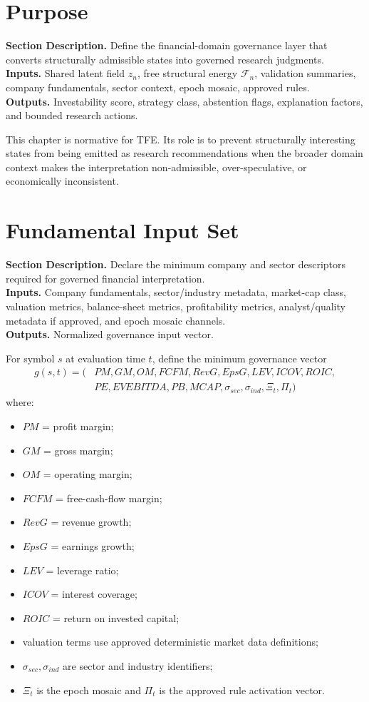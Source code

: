 \documentclass[11pt]{report}
\newcommand{\meta}[3]{\textbf{Section Description.} #1\\
\textbf{Inputs.} #2\\
\textbf{Outputs.} #3\par}
\begin{document}
\section{Purpose}
\meta{Define the financial-domain governance layer that converts structurally admissible states into governed research judgments.}{Shared latent field $z_n$, free structural energy $\mathcal{F}_n$, validation summaries, company fundamentals, sector context, epoch mosaic, approved rules.}{Investability score, strategy class, abstention flags, explanation factors, and bounded research actions.}

This chapter is normative for TFE. Its role is to prevent structurally interesting states from being emitted as research recommendations when the broader domain context makes the interpretation non-admissible, over-speculative, or economically inconsistent.

\section{Fundamental Input Set}
\meta{Declare the minimum company and sector descriptors required for governed financial interpretation.}{Company fundamentals, sector/industry metadata, market-cap class, valuation metrics, balance-sheet metrics, profitability metrics, analyst/quality metadata if approved, and epoch mosaic channels.}{Normalized governance input vector.}

For symbol $s$ at evaluation time $t$, define the minimum governance vector
\begin{align*}
g(s,t)=(&PM,GM,OM,FCFM,RevG,EpsG,LEV,ICOV,ROIC,\\
&PE,EVEBITDA,PB,MCAP,\sigma_{sec},\sigma_{ind},\Xi_t,\Pi_t)
\end{align*}
where:
\begin{itemize}
\item $PM$ = profit margin;
\item $GM$ = gross margin;
\item $OM$ = operating margin;
\item $FCFM$ = free-cash-flow margin;
\item $RevG$ = revenue growth;
\item $EpsG$ = earnings growth;
\item $LEV$ = leverage ratio;
\item $ICOV$ = interest coverage;
\item $ROIC$ = return on invested capital;
\item valuation terms use approved deterministic market data definitions;
\item $\sigma_{sec},\sigma_{ind}$ are sector and industry identifiers;
\item $\Xi_t$ is the epoch mosaic and $\Pi_t$ is the approved rule activation vector.
\end{itemize}
\end{document}
